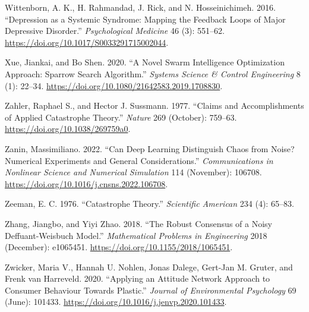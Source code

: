 \documentclass[
  a4paper,
  DIV=11,
  numbers=noendperiod,
  oneside]{scrreprt}
\newlength{\cslhangindent}
\newenvironment{CSLReferences}[2] %
 {\begin{list}{}{%
  \setlength{\itemindent}{0pt}
  \setlength{\leftmargin}{0pt}
  \setlength{\parsep}{0pt}
  \ifodd #1
   \setlength{\leftmargin}{\cslhangindent}
   \setlength{\itemindent}{-1\cslhangindent}
  \fi
  \setlength{\itemsep}{#2\baselineskip}}}
 {\end{list}}
\begin{document}
\begin{CSLReferences}{1}{0}
Wittenborn, A. K., H. Rahmandad, J. Rick, and N. Hosseinichimeh. 2016.
{``Depression as a Systemic Syndrome: Mapping the Feedback Loops of
Major Depressive Disorder.''} \emph{Psychological Medicine} 46 (3):
551--62. \url{https://doi.org/10.1017/S0033291715002044}.

Xue, Jiankai, and Bo Shen. 2020. {``A Novel Swarm Intelligence
Optimization Approach: Sparrow Search Algorithm.''} \emph{Systems
Science \& Control Engineering} 8 (1): 22--34.
\url{https://doi.org/10.1080/21642583.2019.1708830}.

Zahler, Raphael S., and Hector J. Sussmann. 1977. {``Claims and
Accomplishments of Applied Catastrophe Theory.''} \emph{Nature} 269
(October): 759--63. \url{https://doi.org/10.1038/269759a0}.

Zanin, Massimiliano. 2022. {``Can Deep Learning Distinguish Chaos from
Noise? Numerical Experiments and General Considerations.''}
\emph{Communications in Nonlinear Science and Numerical Simulation} 114
(November): 106708. \url{https://doi.org/10.1016/j.cnsns.2022.106708}.

Zeeman, E. C. 1976. {``Catastrophe {Theory}.''} \emph{Scientific
American} 234 (4): 65--83.

Zhang, Jiangbo, and Yiyi Zhao. 2018. {``The {Robust Consensus} of a
{Noisy Deffuant-Weisbuch Model}.''} \emph{Mathematical Problems in
Engineering} 2018 (December): e1065451.
\url{https://doi.org/10.1155/2018/1065451}.

Zwicker, Maria V., Hannah U. Nohlen, Jonas Dalege, Gert-Jan M. Gruter,
and Frenk van Harreveld. 2020. {``Applying an Attitude Network Approach
to Consumer Behaviour Towards Plastic.''} \emph{Journal of Environmental
Psychology} 69 (June): 101433.
\url{https://doi.org/10.1016/j.jenvp.2020.101433}.

\end{CSLReferences}



\printindex
\end{document}
